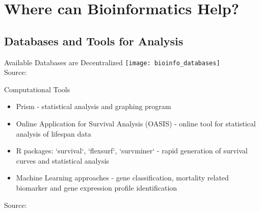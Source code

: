 \section{Where can Bioinformatics Help?}

\subsection{Databases and Tools for Analysis}

\begin{frame}[c]{Available Databases are Decentralized}
    \texttt{[image: bioinfo\_databases]} \\
    Source: \cite{kruempel2019computational}
\end{frame}


\begin{frame}[c]{Computational Tools}
    \begin{itemize}[<+(1)->]
        \item Prism - statistical analysis and graphing program
        \item Online Application for Survival Analysis (OASIS) - online tool for statistical analysis of lifespan data
        \item R packages: `survival`, `flexsurf`, `survminer` - rapid generation of survival curves and statistical analysis
        \item Machine Learning approaches - gene classification, mortality related biomarker and gene expression profile identification
    \end{itemize}
    \pause
    Source: \cite{kruempel2019computational}
\end{frame}


